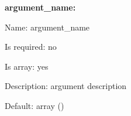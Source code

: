 {\bfseries argument\+\_\+name\+:}


\begin{DoxyItemize}
\item Name\+: argument\+\_\+name
\item Is required\+: no
\item Is array\+: yes
\item Description\+: argument description
\item Default\+: {\ttfamily array ()} 
\end{DoxyItemize}